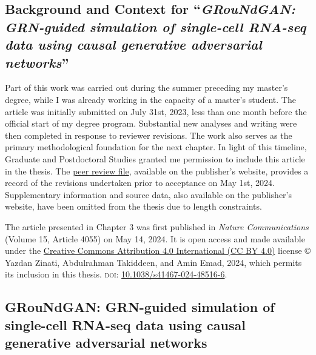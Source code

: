 \begin{singlespace}
\chapter*{Background and Context for ``\textit{GRouNdGAN: GRN-guided simulation of single-cell RNA-seq data using causal generative adversarial networks}''}
\end{singlespace}

Part of this work was carried out during the summer preceding my master’s degree, while I was already working in the capacity of a master’s student. The article was initially submitted on July 31st, 2023, less than one month before the official start of my degree program. Substantial new analyses and writing were then completed in response to reviewer revisions. The work also serves as the primary methodological foundation for the next chapter. In light of this timeline, Graduate and Postdoctoral Studies granted me permission to include this article in the thesis. The \href{https://static-content.springer.com/esm/art\%3A10.1038\%2Fs41467-024-48516-6/MediaObjects/41467_2024_48516_MOESM2_ESM.pdf}{peer review file}, available on the publisher’s website, provides a record of the revisions undertaken prior to acceptance on May 1st, 2024. Supplementary information and source data, also available on the publisher’s website, have been omitted from the thesis due to length constraints.

\vspace{0.5cm}

    \begin{tcolorbox}
The article presented in Chapter 3 was first published in \textit{Nature Communications} (Volume 15, Article 4055) on May 14, 2024. It is open access and made available under the \href{https://creativecommons.org/licenses/by/4.0/}{Creative Commons Attribution 4.0 International (CC BY 4.0)} license © Yazdan Zinati, Abdulrahman Takiddeen, and Amin Emad, 2024, which permits its inclusion in this thesis. \textsc{doi}: \href{https://doi.org/10.1038/s41467-024-48516-6}{10.1038/s41467-024-48516-6}.
    \end{tcolorbox}


\begin{singlespace}
\chapter[GRouNdGAN: GRN-guided simulation of single-cell RNA-seq data using causal generative adversarial networks]{GRouNdGAN: GRN-guided simulation of single-cell RNA-seq data using causal generative adversarial networks}
\label{chap:rapppid}
%
\end{singlespace}

